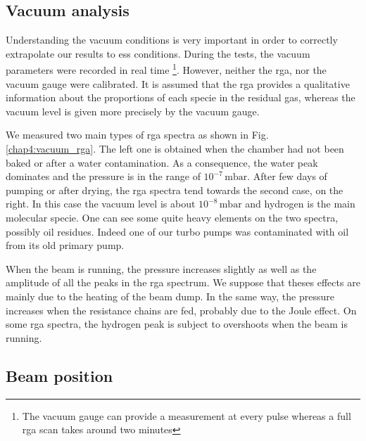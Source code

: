 \begin{refsection}
  \subsection{Vacuum analysis}
  \label{sec4:vacuum}
  Understanding the vacuum conditions is very important in order to correctly extrapolate our results to \acrshort{ess} conditions. During the tests, the vacuum parameters were recorded in real time \footnote{The vacuum gauge can provide a measurement at every pulse whereas a full \acrshort{rga} scan takes around two minutes}. However, neither the \acrshort{rga}, nor the vacuum gauge were calibrated. It is assumed that the \acrshort{rga} provides a qualitative information about the proportions of each specie in the residual gas, whereas the vacuum level is given more precisely by the vacuum gauge.

  We measured two main types of \acrshort{rga} spectra as shown in Fig. \ref{chap4:vacuum_rga}. The left one is obtained when the chamber had not been baked or after a water contamination. As a consequence, the water peak dominates and the pressure is in the range of $10^{-7}\,\mathrm{mbar}$. After few days of pumping or after drying, the \acrshort{rga} spectra tend towards the second case, on the right. In this case the vacuum level is about $10^{-8}\,\mathrm{mbar}$ and hydrogen is the main molecular specie. One can see some quite heavy elements on the two spectra, possibly oil residues. Indeed one of our turbo pumps was contaminated with oil from its old primary pump.

  

  When the beam is running, the pressure increases slightly as well as the amplitude of all the peaks in the \acrshort{rga} spectrum. We suppose that theses effects are mainly due to the heating of the beam dump. In the same way, the pressure increases when the resistance chains are fed, probably due to the Joule effect. On some \acrshort{rga} spectra, the hydrogen peak is subject to overshoots when the beam is running.

  \subsection{Beam position}
  \label{chap4:sec:Position}


\end{refsection}
